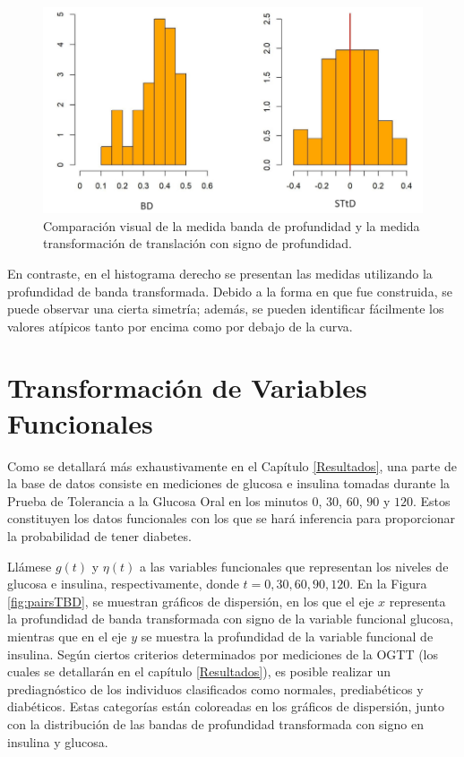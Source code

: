\begin{figure}[H]
    \centering
    \includegraphics[width = 0.7 \textwidth]{Imagenes/comparacionBandas.png}
    \caption{Comparación visual de la medida banda de profundidad y la medida transformación de translación con signo de profundidad.}
    \label{fig:ComparaBandas}
\end{figure}

En contraste, en el histograma derecho se presentan las medidas utilizando la profundidad de banda transformada. Debido a la forma en que fue construida, se puede observar una cierta simetría; además, se pueden identificar fácilmente los valores atípicos tanto por encima como por debajo de la curva.


\section{Transformación de Variables Funcionales}

Como se detallará más exhaustivamente en el Capítulo \ref{Resultados}, una parte de la base de datos consiste en mediciones de glucosa e insulina tomadas durante la Prueba de Tolerancia a la Glucosa Oral en los minutos $0$, $30$, $60$, $90$ y $120$. Estos constituyen los datos funcionales con los que se hará inferencia para proporcionar la probabilidad de tener diabetes. 

Llámese $g(t)$ y $\eta(t)$ a las variables funcionales que representan los niveles de glucosa e insulina, respectivamente, donde $t = 0, 30, 60, 90, 120$. En la Figura \ref{fig:pairsTBD}, se muestran gráficos de dispersión, en los que el eje $x$ representa la profundidad de banda transformada con signo de la variable funcional glucosa, mientras que en el eje $y$ se muestra la profundidad de la variable funcional de insulina. Según ciertos criterios determinados por mediciones de la OGTT (los cuales se detallarán en el capítulo \ref{Resultados}), es posible realizar un prediagnóstico de los individuos clasificados como normales, prediabéticos y diabéticos. Estas categorías están coloreadas en los gráficos de dispersión, junto con la distribución de las bandas de profundidad transformada con signo en insulina y glucosa.

